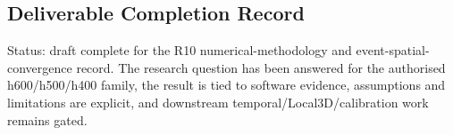 \subsection{Deliverable Completion Record}
\label{sec:res-ver-cnv-completion-record}

Status: draft complete for the R10 numerical-methodology and
event-spatial-convergence record. The research question has been
answered for the authorised h600/h500/h400 family, the result is tied to
software evidence, assumptions and limitations are explicit, and
downstream temporal/Local3D/calibration work remains gated.
